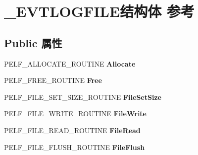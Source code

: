 \hypertarget{struct___e_v_t_l_o_g_f_i_l_e}{}\section{\+\_\+\+E\+V\+T\+L\+O\+G\+F\+I\+L\+E结构体 参考}
\label{struct___e_v_t_l_o_g_f_i_l_e}
\subsection*{Public 属性}
\begin{DoxyCompactItemize}
\item 
\mbox{\label{struct___e_v_t_l_o_g_f_i_l_e_a0f1a105da36a2aa151087ba01b110ec0}} 
P\+E\+L\+F\+\_\+\+A\+L\+L\+O\+C\+A\+T\+E\+\_\+\+R\+O\+U\+T\+I\+NE {\bfseries Allocate}
\item 
\mbox{\label{struct___e_v_t_l_o_g_f_i_l_e_af0384290d70fc8b55fd830671b015ea0}} 
P\+E\+L\+F\+\_\+\+F\+R\+E\+E\+\_\+\+R\+O\+U\+T\+I\+NE {\bfseries Free}
\item 
\mbox{\label{struct___e_v_t_l_o_g_f_i_l_e_afc787bcf130c89ed36255819a5c3178f}} 
P\+E\+L\+F\+\_\+\+F\+I\+L\+E\+\_\+\+S\+E\+T\+\_\+\+S\+I\+Z\+E\+\_\+\+R\+O\+U\+T\+I\+NE {\bfseries File\+Set\+Size}
\item 
\mbox{\label{struct___e_v_t_l_o_g_f_i_l_e_a821be02fb02bf616705256286170e945}} 
P\+E\+L\+F\+\_\+\+F\+I\+L\+E\+\_\+\+W\+R\+I\+T\+E\+\_\+\+R\+O\+U\+T\+I\+NE {\bfseries File\+Write}
\item 
\mbox{\label{struct___e_v_t_l_o_g_f_i_l_e_ad209121ff535c90f43de0f06380e3f28}} 
P\+E\+L\+F\+\_\+\+F\+I\+L\+E\+\_\+\+R\+E\+A\+D\+\_\+\+R\+O\+U\+T\+I\+NE {\bfseries File\+Read}
\item 
\mbox{\label{struct___e_v_t_l_o_g_f_i_l_e_a17c931fd5ac6c2a206a47ce877103525}} 
P\+E\+L\+F\+\_\+\+F\+I\+L\+E\+\_\+\+F\+L\+U\+S\+H\+\_\+\+R\+O\+U\+T\+I\+NE {\bfseries File\+Flush}
\item 
\mbox{\label{struct___e_v_t_l_o_g_f_i_l_e_a7e7568b13ee072fabcd3f6b9c2bb3ae1}} 

\end{DoxyCompactItemize}
